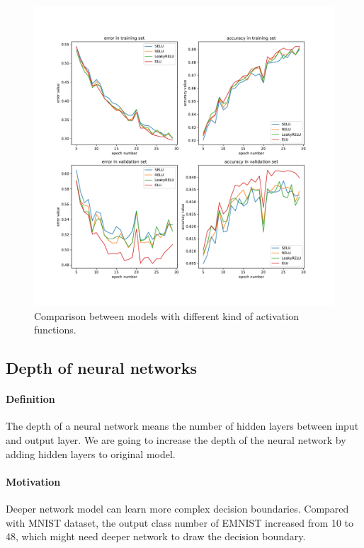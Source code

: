 \documentclass{article}
\begin{document}
\begin{figure}[tb]
\begin{center}
\centerline{\includegraphics[width=\columnwidth]{fig/activation_function.pdf}}
\caption{Comparison between models with different kind of activation functions.}
\label{fig:base_act_func}
\end{center}
\end{figure} 


\subsection{Depth of neural networks}

\paragraph{Definition} The depth of a neural network means the number of hidden layers between input and output layer. We are going to increase the depth of the neural network by adding hidden layers to original model.

\paragraph{Motivation} Deeper network model can learn more complex decision boundaries\citep{Goodfellow-et-al-2016}.  Compared with MNIST dataset, the output class number of EMNIST increased from 10 to 48, which might need deeper network to draw the decision boundary. 
\end{document}
